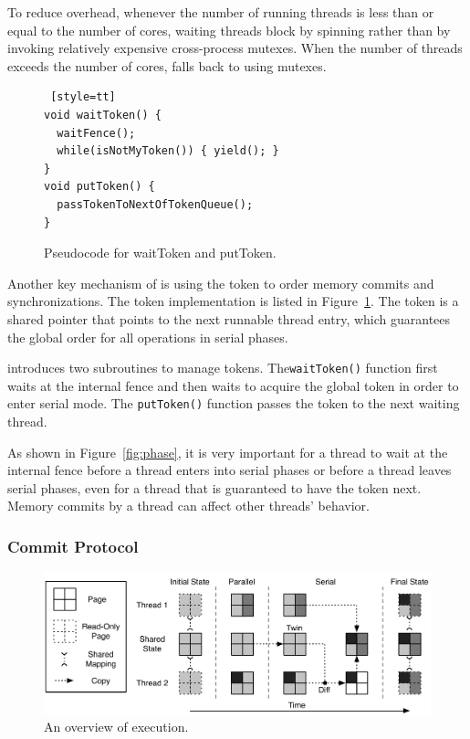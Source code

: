 To reduce overhead, whenever the number of running threads is
less than or equal to the number of cores, waiting threads block by spinning rather than by invoking relatively expensive cross-process \pthreads{} mutexes. When the number of threads exceeds the number of cores, \dthreads{} falls back to using \pthreads{} mutexes.

\begin{figure}
\begin{lstlisting} [style=tt]
void waitToken() {
  waitFence();
  while(isNotMyToken()) { yield(); }
}
void putToken() {
  passTokenToNextOfTokenQueue();
}
\end{lstlisting}
\caption{Pseudocode for waitToken and putToken. 
\label{fig:token}}
\end{figure}

Another key mechanism of \dthreads{} is using the token to order memory commits and synchronizations. The token implementation is listed in Figure~\ref{fig:token}. The token is a shared pointer that points to the next runnable thread entry, which guarantees the global order for all operations in serial phases.  

\dthreads{} introduces two subroutines to manage tokens.  The\texttt{waitToken()} function first waits at the internal fence and then waits to acquire the global token
in order to enter serial mode. The \texttt{putToken()} function passes the token to the next waiting thread. 

As shown in Figure~\ref{fig:phase}, it is very important for a thread to wait at the internal fence before a thread enters into serial phases or before a thread leaves serial phases, even for a thread that is guaranteed to have the token next. Memory commits by a thread can affect other threads' behavior. 

\subsubsection{Commit Protocol}
\begin{figure}
{\centering
\includegraphics[width=5in]{dthreads/figure/architecture-diagram}
\caption{An overview of \dthreads{} execution.\label{fig:architecture}}
}
\end{figure}

